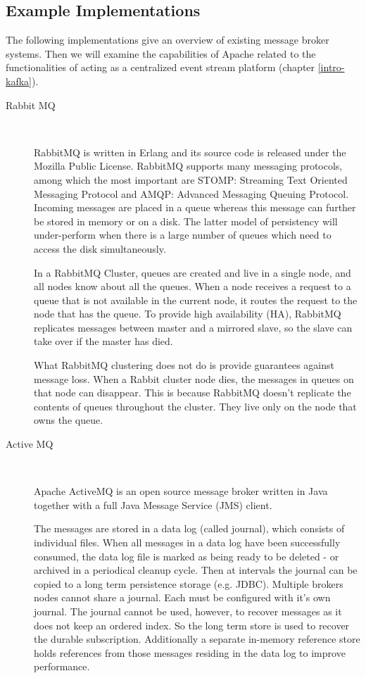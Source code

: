 \subsection{Example Implementations}

The following implementations give an overview of existing message broker systems. 
Then we will examine the capabilities of Apache related to the functionalities of acting as a centralized event stream platform (chapter \ref{intro-kafka}).

\begin{description}
    \item [Rabbit MQ] \hfill \\
    {
    RabbitMQ is written in Erlang and its source code is released under the
    Mozilla Public License. RabbitMQ supports many messaging protocols, among
    which the most important are STOMP: Streaming Text Oriented Messaging
    Protocol and AMQP: Advanced Messaging Queuing Protocol. Incoming messages
    are placed in a queue whereas this message can further be stored in memory
    or on a disk. The latter model of persistency will under-perform when there is 
    a large number of queues which need to access the disk simultaneously.
    \cite{rabbitmq}

    In a RabbitMQ Cluster, queues are created and live in a single node, and all
    nodes know about all the queues. When a node receives a request to a queue
    that is not available in the current node, it routes the request to the node
    that has the queue. To provide high availability (HA), RabbitMQ replicates
    messages between master and a mirrored slave, so the slave can take over if the
    master has died. \cite{wickramarachchi2012andes}

    What RabbitMQ clustering does not do is provide guarantees against message loss.
    When a Rabbit cluster node dies, the messages in queues on that
    node can disappear. This is because RabbitMQ doesn't replicate the contents
    of queues throughout the cluster. They live only on the node that owns the
    queue. \cite{videla2012rabbitmq}
    }
    \item [Active MQ] \hfill \\
    {
    Apache ActiveMQ is an open source message broker written in Java
    together with a full Java Message Service (JMS) client. 

    The messages are stored in a data log (called journal), which consists of
    individual files. When all messages in a data log have been successfully
    consumed, the data log file is marked as being ready to be deleted - or
    archived in a periodical cleanup cycle. Then at intervals the journal can be
    copied to a long term persistence storage (e.g. JDBC). Multiple
    brokers nodes cannot share a journal. Each must be configured with it's own
    journal. The journal cannot be used, however, to recover messages as it does
    not keep an ordered index. So the long term store is used to recover the
    durable subscription. Additionally a separate in-memory reference store
    holds references from those messages residing in the data log to improve
    performance.

}
\end{description}
